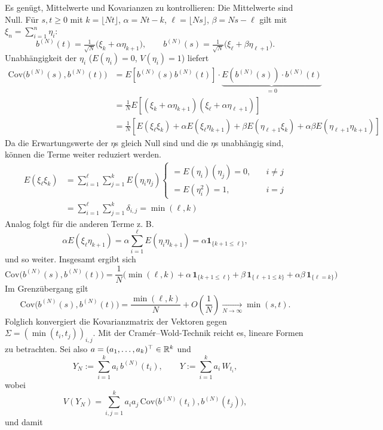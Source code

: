 \begin{satz}
Es genügt, Mittelwerte und Kovarianzen zu kontrollieren:
Die Mittelwerte sind Null. Für $s,t\ge0$ mit $k=\lfloor Nt\rfloor$, $\alpha=Nt-k$, 
$\ell=\lfloor Ns\rfloor$, $\beta=Ns-\ell$ gilt mit $\xi_n=\sum_{i=1}^n\eta_i$:
$$
b^{(N)}(t)=\tfrac1{\sqrt N}\big(\xi_k+\alpha\eta_{k+1}\big),\qquad
b^{(N)}(s)=\tfrac1{\sqrt N}\big(\xi_\ell+\beta\eta_{\ell+1}\big).
$$
Unabhängigkeit der $\eta_i$ ($E(\eta_i)=0$, $V(\eta_i)=1$) liefert
$$
\begin{aligned}
\mathrm{Cov}\!\big(b^{(N)}(s),b^{(N)}(t)\big) &= E \left [ b^{(N)}(s) b^{(N)}(t) \right ] \cdot \underbrace{E(b^{(N)}(s)) \cdot b^{(N)}(t)}_{=0}
\\ &= \frac{1}{N} E \left [ (\xi_k + \alpha \eta_{k+1}) (\xi_\ell + \alpha \eta_{\ell+1}) \right ] 
\\ &= \frac{1}{N} \left [ E(\xi_\ell \xi_k) + \alpha E(\xi_\ell \eta_{k+1}) + \beta E(\eta_{\ell + 1} \xi_k) + \alpha \beta E(\eta_{\ell + 1} \eta_{k+1}) \right ]
\end{aligned}
$$
Da die Erwartungswerte der $\eta$s gleich Null sind und die $\eta$s unabhängig sind, können die Terme weiter reduziert werden.
$$
\begin{aligned}
E(\xi_\ell \xi_k) &= \sum_{i=1}^\ell \sum_{j=1}^k E(\eta_i \eta_j) \begin{cases} = E(\eta_i)(\eta_j) = 0, \quad &i \neq j \\ = E(\eta_i^2) = 1, \quad &i = j \end{cases}
\\ &= \sum_{i=1}^\ell \sum_{j=1}^k \delta_{i, j} = \min(\ell, k)
\end{aligned}
$$
Analog folgt für die anderen Terme z. B.
$$\alpha E(\xi_\ell \eta_{k+1}) = \alpha \sum_{i=1}^\ell E(\eta_i \eta_{k+1}) = \alpha \mathbf 1_{\{k+1\le \ell\}},$$
und so weiter. Insgesamt ergibt sich
$$
\mathrm{Cov}\!\big(b^{(N)}(s),b^{(N)}(t)\big) = \frac1N\Big(\min(\ell,k)+\alpha\,\mathbf 1_{\{k+1\le \ell\}}+\beta\,\mathbf 1_{\{\ell+1\le k\}}+\alpha\beta\,\mathbf 1_{\{\ell=k\}}\Big)
$$
Im Grenzübergang gilt
$$
\mathrm{Cov}\!\big(b^{(N)}(s),b^{(N)}(t)\big)
=\frac{\min(\ell,k)}{N}+O\!\left(\frac1N\right)\xrightarrow[N\to\infty]{}\min(s,t).
$$
Folglich konvergiert die Kovarianzmatrix der Vektoren gegen 
$\Sigma=(\min(t_i,t_j))_{i,j}$.
Mit der Cramér–Wold-Technik reicht es, lineare Formen zu betrachten. Sei also $a=(a_1,\dots,a_k)^\top\in\Bbb R^k$ und
$$
Y_N:=\sum_{i=1}^k a_i\,b^{(N)}(t_i),\qquad
Y:=\sum_{i=1}^k a_i\,W_{t_i},
$$
wobei
$$
V(Y_N)=\sum_{i,j=1}^k a_i a_j\,\mathrm{Cov}\!\big(b^{(N)}(t_i),b^{(N)}(t_j)\big),
$$
und damit

\end{satz}
